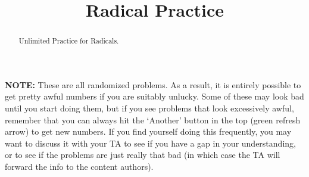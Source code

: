 \documentclass{ximeraXloud}
\title{Radical Practice}
\begin{document}
\begin{abstract}
    Unlimited Practice for Radicals.
\end{abstract}
\maketitle

\textbf{NOTE:} These are all randomized problems. As a result, it is entirely possible to get pretty awful numbers if you are suitably unlucky. Some of these may look bad until you start doing them, but if you see problems that look excessively awful, remember that you can always hit the `Another' button in the top (green refresh arrow) to get new numbers. If you find yourself doing this frequently, you may want to discuss it with your TA to see if you have a gap in your understanding, or to see if the problems are just really that bad (in which case the TA will forward the info to the content authors).

%
\end{document}
